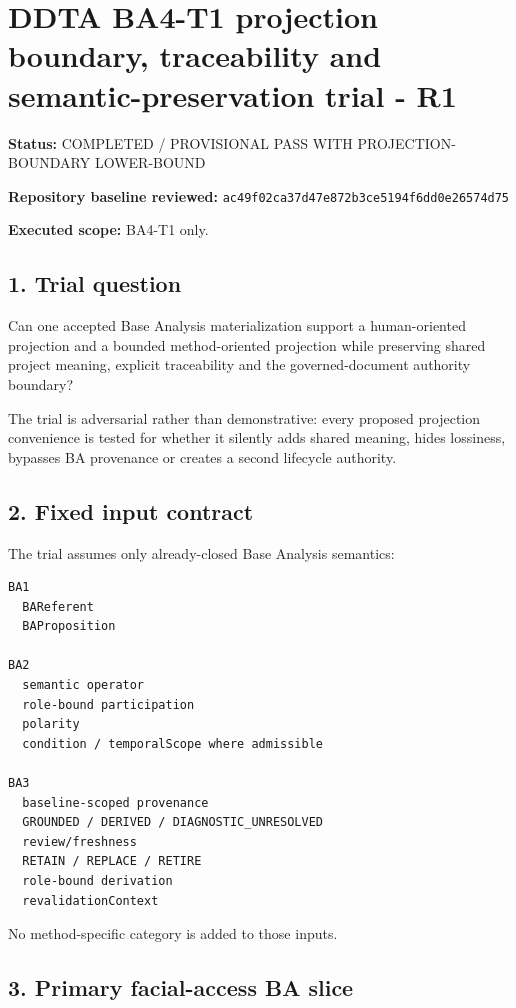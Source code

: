 \documentclass[11pt,a4paper]{article}
\begin{document}
\section{DDTA BA4-T1 projection boundary, traceability and semantic-preservation trial - R1}\label{ddta-ba4-t1-projection-boundary-traceability-and-semantic-preservation-trial---r1}

\textbf{Status:} COMPLETED / PROVISIONAL PASS WITH PROJECTION-BOUNDARY LOWER-BOUND

\textbf{Repository baseline reviewed:} \texttt{ac49f02ca37d47e872b3ce5194f6dd0e26574d75}

\textbf{Executed scope:} BA4-T1 only.

\subsection{1. Trial question}\label{1-trial-question}

Can one accepted Base Analysis materialization support a human-oriented projection and a bounded method-oriented projection while preserving shared project meaning, explicit traceability and the governed-document authority boundary?

The trial is adversarial rather than demonstrative: every proposed projection convenience is tested for whether it silently adds shared meaning, hides lossiness, bypasses BA provenance or creates a second lifecycle authority.

\subsection{2. Fixed input contract}\label{2-fixed-input-contract}

The trial assumes only already-closed Base Analysis semantics:

\begin{verbatim}
BA1
  BAReferent
  BAProposition

BA2
  semantic operator
  role-bound participation
  polarity
  condition / temporalScope where admissible

BA3
  baseline-scoped provenance
  GROUNDED / DERIVED / DIAGNOSTIC_UNRESOLVED
  review/freshness
  RETAIN / REPLACE / RETIRE
  role-bound derivation
  revalidationContext
\end{verbatim}

No method-specific category is added to those inputs.

\subsection{3. Primary facial-access BA slice}\label{3-primary-facial-access-ba-slice}
\end{document}
